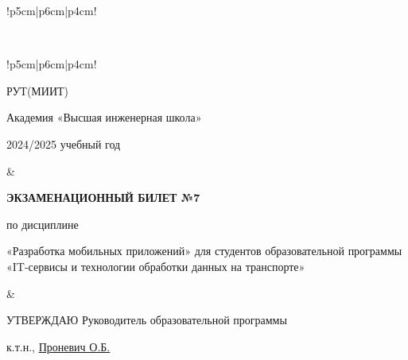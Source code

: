 \documentclass[a4paper]{article}
\begin{document}
\begin{tabular}{!{\vrule width 2pt}p{5cm}|p{6cm}|p{4cm}!{\vrule width 2pt}}
{\begin{minipage}{16cm}
\vspace{0.2cm}
    
\end{minipage}
}
\\
\end{tabular}

\newpage


\begin{tabular}{!{\vrule width 2pt}p{5cm}|p{6cm}|p{4cm}!{\vrule width 2pt}}

    {\centering 
    \fontsize{14pt}{16pt}\selectfont
    РУТ(МИИТ)

\vspace{14pt}

Академия «Высшая инженерная школа»

\vspace{14pt}

2024/2025 учебный год

    }
&
{
    \centering
\fontsize{14pt}{16pt}\selectfont

\textbf{ЭКЗАМЕНАЦИОННЫЙ
БИЛЕТ №7}


по дисциплине 

«Разработка мобильных приложений» 
\fontsize{12pt}{14pt}\selectfont
для студентов образовательной программы «IT-сервисы и технологии обработки данных на транспорте»

}
&
{
\centering
\fontsize{14pt}{16pt}\selectfont

УТВЕРЖДАЮ
Руководитель образовательной программы

\vspace{1cm}

\fontsize{12pt}{14pt}\selectfont
\underline{\hspace{3cm}}

к.т.н., \underline{Проневич О.Б.}

}
\\
\hline
{}
\end{tabular}
\end{document}
